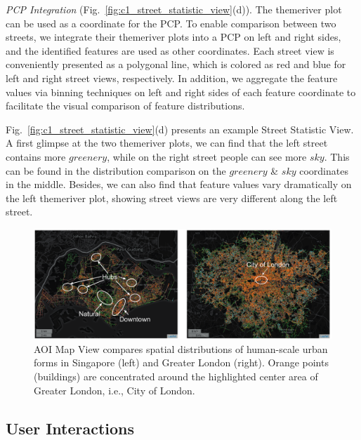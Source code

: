 \noindent
\textit{PCP Integration} (Fig.~\ref{fig:c1_street_statistic_view}(d)).
The themeriver plot can be used as a coordinate for the PCP.
To enable comparison between two streets, we integrate their themeriver plots into a PCP on left and right sides, and the identified features are used as other coordinates.
Each street view is conveniently presented as a polygonal line, which is colored as red and blue for left and right street views, respectively.
In addition, we aggregate the feature values via binning techniques on left and right sides of each feature coordinate to facilitate the visual comparison of feature distributions.

\vspace*{1mm}
Fig.~\ref{fig:c1_street_statistic_view}(d) presents an example Street Statistic View.
A first glimpse at the two themeriver plots, we can find that the left street contains more $greenery$, while on the right street people can see more $sky$.
This can be found in the distribution comparison on the $greenery$ \& $sky$ coordinates in the middle.
Besides, we can also find that feature values vary dramatically on the left themeriver plot, showing street views are very different along the left street.


\begin{figure}[t]
	\centering
	\includegraphics[width=0.95\columnwidth]{figure/streetvizor/fig8_study_1/study_1_spatial}
	\vspace{-4mm}
	\caption{
	AOI Map View compares spatial distributions of human-scale urban forms in Singapore (left) and Greater London (right).
	Orange points (buildings) are concentrated around the highlighted center area of Greater London, i.e., City of London.}
	\label{fig:c1_study_1_spatial}
\end{figure}




\subsection{User Interactions}
\label{ssec:c1_user_interaction}

